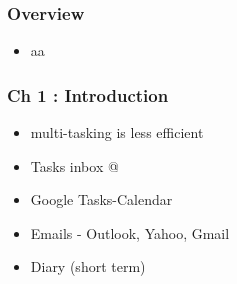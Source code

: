 \begin{frame}[fragile]\frametitle{Overview}

\begin{itemize}
\item aa
\end{itemize}

\end{frame}

\begin{frame}[fragile]\frametitle{Ch 1 : Introduction}
\begin{itemize}
\item multi-tasking is less efficient
\item Tasks inbox @
\item Google Tasks-Calendar
\item Emails - Outlook, Yahoo, Gmail
\item Diary (short term)
\end{itemize}
\end{frame}
